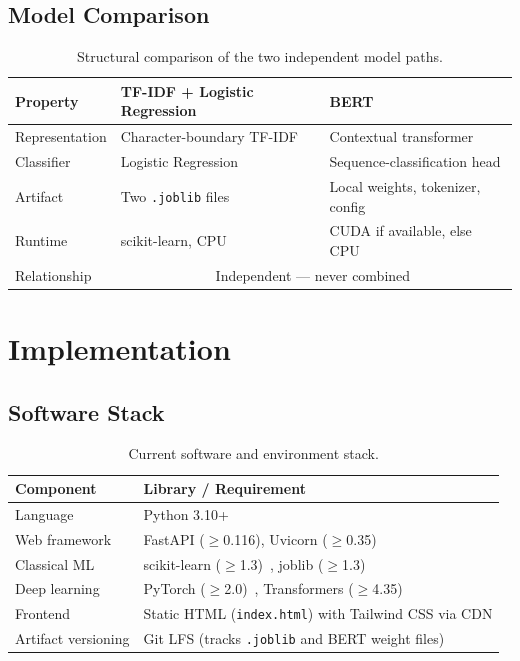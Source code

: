 \documentclass[12pt,a4paper]{article}
\begin{document}
\subsection{Model Comparison}

\begin{table}[H]
\centering
\caption{Structural comparison of the two independent model paths.}
\begin{tabular}{lll}
\toprule
\textbf{Property} & \textbf{TF-IDF + Logistic Regression} & \textbf{BERT} \\
\midrule
Representation & Character-boundary TF-IDF & Contextual transformer \\
Classifier & Logistic Regression & Sequence-classification head \\
Artifact & Two \texttt{.joblib} files & Local weights, tokenizer, config \\
Runtime & scikit-learn, CPU & CUDA if available, else CPU \\
Relationship & \multicolumn{2}{c}{Independent --- never combined} \\
\bottomrule
\end{tabular}
\end{table}

\section{Implementation}

\subsection{Software Stack}

\begin{table}[H]
\centering
\caption{Current software and environment stack.}
\begin{tabular}{ll}
\toprule
\textbf{Component} & \textbf{Library / Requirement} \\
\midrule
Language & Python 3.10+ \\
Web framework & FastAPI ($\geq$0.116), Uvicorn ($\geq$0.35) \\
Classical ML & scikit-learn ($\geq$1.3)~\cite{pedregosa2011scikit}, joblib ($\geq$1.3) \\
Deep learning & PyTorch ($\geq$2.0)~\cite{paszke2019pytorch}, Transformers ($\geq$4.35)~\cite{wolf2020transformers} \\
Frontend & Static HTML (\texttt{index.html}) with Tailwind CSS via CDN \\
Artifact versioning & Git LFS (tracks \texttt{.joblib} and BERT weight files) \\
\bottomrule
\end{tabular}
\end{table}
\end{document}
